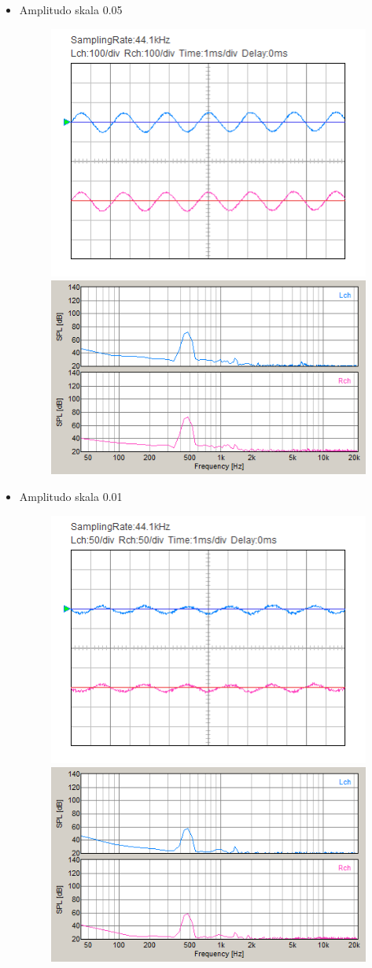 \documentclass[12pt,]{article}
\begin{document}
\begin{itemize}
\begin{itemize}
			\newpage
			\item Amplitudo skala 0.05
			\begin{figure}[H]
				\centering
				\includegraphics[width=0.45\linewidth]{result/day_4/500Hz/tone005}
				\includegraphics[width=0.45\linewidth]{result/day_4/500Hz/fft_tone005}
			\end{figure}
		
			\item Amplitudo skala 0.01
			\begin{figure}[H]
				\centering
				\includegraphics[width=0.45\linewidth]{result/day_4/500Hz/tone001}
				\includegraphics[width=0.45\linewidth]{result/day_4/500Hz/fft_tone001}
			\end{figure}
		

\end{itemize}
\end{itemize}
\end{document}
